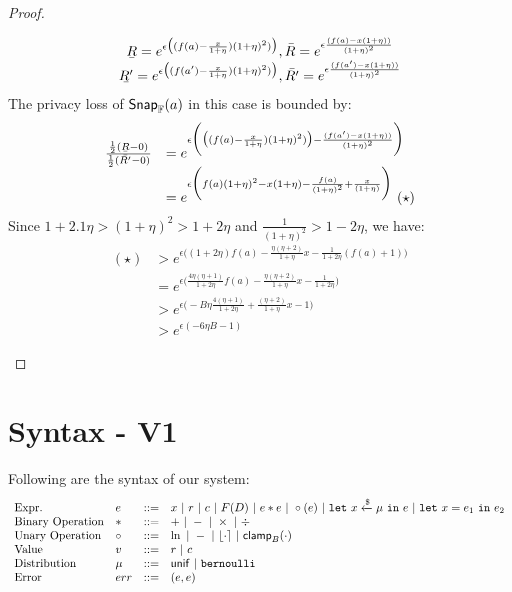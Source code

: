 \documentclass[a4paper,11pt]{article}
\begin{document}
\begin{proof}
\begin{itemize}
		\[
		\begin{array}{c}
		\ubar{R} = e^{\epsilon 
		\big( (f(a) -  \frac{x}{1 + \eta}) (1 + \eta)^2) \big)},
		\bar{R} = e^{\epsilon 
		\frac{(f(a) - x(1 + \eta))}{(1 + \eta)^2}}
		\\
		\ubar{R'} = e^{\epsilon 
		\big( (f(a') -  \frac{x}{1 + \eta}) (1 + \eta)^2) \big)},
		\bar{R'} = e^{\epsilon 
		\frac{(f(a') - x(1 + \eta))}{(1 + \eta)^2}}
		\end{array}
		\]
		The privacy loss of $\mathsf{Snap}_{\mathbb{F}}(a)$ in this case is bounded by:
		\[
		\begin{array}{ll}
		\frac
		{\frac{1}{2}(\ubar{R} - 0)}
		{\frac{1}{2}(\bar{R'} - 0)}
		& = e^{\epsilon
		\bigg(
		\big( (f(a) -  \frac{x}{1 + \eta}) (1 + \eta)^2) \big)
		-
		\frac{(f(a') - x(1 + \eta))}{(1 + \eta)^2}
		\bigg)}\\
		& = e^{\epsilon
		\bigg(
		f(a)(1 + \eta)^2 - x(1 + \eta) 
		- \frac{f(a)}{(1 + \eta)^2} + \frac{x}{(1 + \eta)}   
		\bigg)} ~ (\star)
		\end{array}
		\]
		Since $ 1 + 2.1\eta > (1 + \eta)^2 > 1 + 2\eta$ and $\frac{1}{(1 + \eta)^2} > 1 - 2 \eta$, we have:
		\[
		\begin{array}{ll}
		(\star) & > e^{\epsilon \big(
		(1 + 2\eta) f(a) - \frac{\eta(\eta + 2)}{1 + \eta} x
		- \frac{1}{1 + 2\eta}(f(a) + 1)
		\big)}\\
		& = e^{\epsilon\big(
		\frac{4\eta(\eta + 1)}{1 + 2\eta} f(a) 
		- \frac{\eta(\eta + 2)}{1 + \eta} x
		- \frac{1}{1 + 2\eta}		
		\big)}\\
		& > e^{\epsilon\big( -B \eta
		\frac{4(\eta + 1)}{1 + 2\eta} + \frac{(\eta + 2)}{1 + \eta} x - 1	
		\big)}\\
%
		& > e^{\epsilon(-6 \eta B - 1)}
		\end{array}
		\]
	\end{itemize}



\end{proof}

\section{Syntax - V1}
Following are the syntax of our system:
%
\[\begin{array}{llll}
\mbox{Expr.} & \expr & ::= & \varx 
	~|~ \rval ~|~ \fval
	~|~ F(\data) ~|~ \expr \bop \expr
	~|~ \uop (\expr) ~|~ \elet ~ \varx \samplel \edistr ~ \ein ~ \expr
	~|~ \elet ~ \varx = \expr_1 ~ \ein ~ \expr_2 \\
%
\mbox{Binary Operation} & \bop & ::= & + ~|~ - ~|~ \times ~|~ \div \\
%
\mbox{Unary Operation} & \uop & ::= & \ln ~|~ - ~|~ \round{\cdot} 
	~|~ \clamp_B(\cdot) \\
%
\mbox{Value} & \valv & ::= & \rval ~|~  \fval \\
%
\mbox{Distribution} & \edistr & ::= & \uniform ~|~ \bernoulli \\ 
%
\mbox{Error} & \err & ::= & (\expr, \expr)
%
\end{array}
\]
\end{document}
